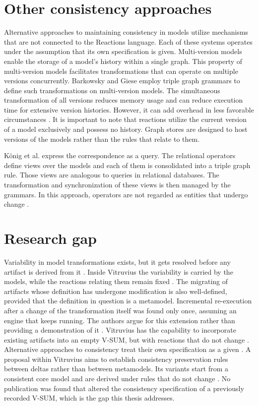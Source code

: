 \section{Other consistency approaches}
\label{sec:RelatedWork:OtherConsistencyApproaches}

Alternative approaches to maintaining consistency in models utilize mechanisms that are not connected to the Reactions language.
Each of these systems operates under the assumption that its own specification is given.
Multi-version models enable the storage of a model's history within a single graph.
This property of multi-version models facilitates transformations that can operate on multiple versions concurrently.
Barkowsky and Giese employ triple graph grammars to define such transformations on multi-version models.
The simultaneous transformation of all versions reduces memory usage and can reduce execution time for extensive version histories.
However, it can add overhead in less favorable circumstances \cite{barkowsky2023incremental}.
It is important to note that reactions utilize the current version of a model exclusively and possess no history.
Graph stores are designed to host versions of the models rather than the rules that relate to them.

König et al. express the correspondence as a query.
The relational operators define views over the models and each of them is consolidated into a triple graph rule.
Those views are analogous to queries in relational databases.
The transformation and synchronization of these views is then managed by the grammars.
In this approach, operators are not regarded as entities that undergo change \cite{konig2025transforming}.

\section{Research gap}
\label{sec:RelatedWork:ResearchGap}

Variability in model transformations exists, but it gets resolved before any artifact is derived from it \cite{struber2018variability,sijtema2010introducing}.
Inside Vitruvius the variability is carried by the models, while the reactions relating them remain fixed \cite{ananieva2022preserving,neumann2025towards}.
The migrating of artifacts whose definition has undergone modification is also well-defined, provided that the definition in question is a metamodel.
Incremental re-execution after a change of the transformation itself was found only once, assuming an engine that keeps running.
The authors argue for this extension rather than providing a demonstration of it \cite{hearnden2006incremental}.
Vitruvius has the capability to incorporate existing artifacts into an empty V-SUM, but with reactions that do not change \cite{leonhardt2015integration}.
Alternative approaches to consistency treat their own specification as a given \cite{barkowsky2023incremental,konig2025transforming}.
A proposal within Vitruvius aims to establish consistency preservation rules between deltas rather than between metamodels.
Its variants start from a consistent core model and are derived under rules that do not change \cite{neumann2025towards}.
No publication was found that altered the consistency specification of a previously recorded V-SUM, which is the gap this thesis addresses.